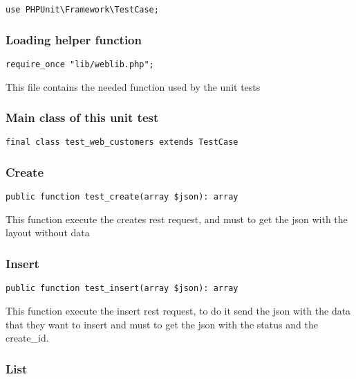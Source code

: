 \documentclass[a4paper]{article}
\begin{document}
\begin{lstlisting}
use PHPUnit\Framework\TestCase;
\end{lstlisting}

\hypertarget{toc57}{}
\subsubsection{Loading helper function}

\begin{lstlisting}
require_once "lib/weblib.php";
\end{lstlisting}

This file contains the needed function used by the unit tests

\hypertarget{toc58}{}
\subsubsection{Main class of this unit test}

\begin{lstlisting}
final class test_web_customers extends TestCase
\end{lstlisting}

\hypertarget{toc59}{}
\subsubsection{Create}

\begin{lstlisting}
public function test_create(array $json): array
\end{lstlisting}

This function execute the creates rest request, and must to get the
json with the layout without data

\hypertarget{toc60}{}
\subsubsection{Insert}

\begin{lstlisting}
public function test_insert(array $json): array
\end{lstlisting}

This function execute the insert rest request, to do it send the json with
the data that they want to insert and must to get the json with the status
and the create\_id.

\hypertarget{toc61}{}
\subsubsection{List}
\end{document}
